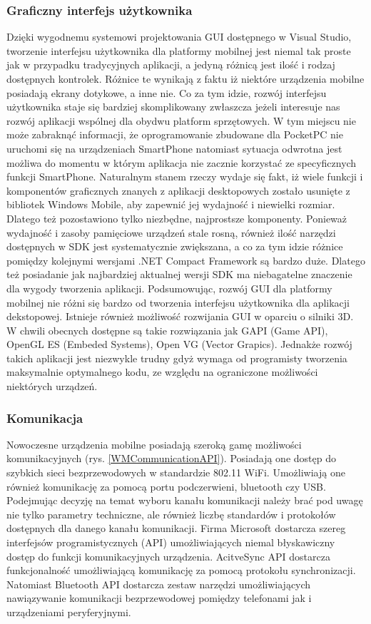 \subsubsection{Graficzny interfejs użytkownika}
Dzięki wygodnemu systemowi projektowania GUI dostępnego w Visual Studio, tworzenie
interfejsu użytkownika dla platformy mobilnej jest niemal tak proste jak w
przypadku tradycyjnych aplikacji, a jedyną różnicą jest ilość i rodzaj dostępnych
kontrolek. Różnice te wynikają z faktu iż niektóre urządzenia mobilne posiadają
ekrany dotykowe, a inne nie. Co za tym idzie, rozwój interfejsu użytkownika staje
się bardziej skomplikowany zwłaszcza jeżeli interesuje nas rozwój aplikacji
wspólnej dla obydwu platform sprzętowych. W tym miejscu nie może zabraknąć
informacji, że oprogramowanie zbudowane dla PocketPC nie uruchomi się na
urządzeniach SmartPhone natomiast sytuacja odwrotna jest możliwa do momentu w
którym aplikacja nie zacznie korzystać ze specyficznych funkcji SmartPhone.
Naturalnym stanem rzeczy wydaje się fakt, iż wiele funkcji i komponentów
graficznych znanych z aplikacji desktopowych zostało usunięte z bibliotek Windows
Mobile, aby zapewnić jej wydajność i niewielki rozmiar. Dlatego też pozostawiono
tylko niezbędne, najprostsze komponenty. Ponieważ wydajność  i zasoby pamięciowe
urządzeń stale rosną, również ilość narzędzi dostępnych w SDK jest systematycznie
zwiększana, a co za tym idzie różnice pomiędzy kolejnymi wersjami .NET Compact
Framework są bardzo duże. Dlatego też posiadanie jak najbardziej aktualnej wersji
SDK ma niebagatelne znaczenie dla wygody tworzenia aplikacji. Podsumowując, rozwój
GUI dla platformy mobilnej nie różni się bardzo od tworzenia interfejsu
użytkownika dla aplikacji dekstopowej. Istnieje również możliwość rozwijania GUI
w oparciu o silniki 3D. W chwili obecnych dostępne są takie rozwiązania jak GAPI
(Game API), OpenGL ES (Embeded Systems), Open VG (Vector Grapics). Jednakże
rozwój takich aplikacji jest niezwykle trudny gdyż wymaga od programisty
tworzenia maksymalnie optymalnego kodu, ze względu na ograniczone możliwości
niektórych urządzeń.

\subsubsection{Komunikacja}
Nowoczesne urządzenia mobilne posiadają szeroką gamę możliwości komunikacyjnych (rys. \ref{WMCommunicationAPI}).
Posiadają one dostęp do szybkich sieci bezprzewodowych w standardzie 802.11 WiFi.
Umożliwiają one również komunikację za pomocą portu podczerwieni, bluetooth czy
USB. Podejmując decyzję na temat wyboru kanału komunikacji należy brać pod uwagę
nie tylko parametry techniczne, ale również liczbę standardów i protokołów
dostępnych dla danego kanału komunikacji. Firma Microsoft dostarcza szereg
interfejsów programistycznych (API) umożliwiających niemal błyskawiczny dostęp do
funkcji komunikacyjnych urządzenia. AcitveSync API dostarcza funkcjonalność
umożliwiającą komunikację za pomocą protokołu synchronizacji. Natomiast Bluetooth
API dostarcza zestaw narzędzi umożliwiających nawiązywanie komunikacji
bezprzewodowej pomiędzy telefonami jak i urządzeniami peryferyjnymi.


